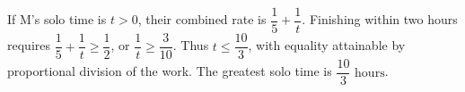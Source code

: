 If M's solo time is $t>0$, their combined rate is $\dfrac{1}{5}+\dfrac{1}{t}$. Finishing within two hours requires $\dfrac{1}{5}+\dfrac{1}{t}\ge\dfrac{1}{2}$, or $\dfrac{1}{t}\ge\dfrac{3}{10}$. Thus $t\le\dfrac{10}{3}$, with equality attainable by proportional division of the work. The greatest solo time is $\boxed{\dfrac{10}{3}\text{ hours}}$.

